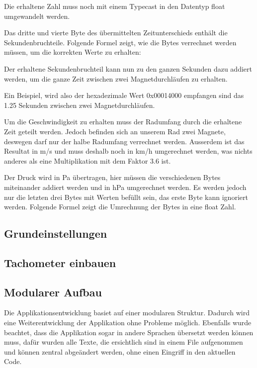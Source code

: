 
Die erhaltene Zahl muss noch mit einem Typecast in den Datentyp float umgewandelt werden.

Das dritte und vierte Byte des übermittelten Zeitunterschieds enthält die Sekundenbruchteile. Folgende Formel zeigt, wie die Bytes verrechnet werden müssen, um die korrekten Werte zu erhalten:


Der erhaltene Sekundenbruchteil kann nun zu den ganzen Sekunden dazu addiert werden, um die ganze Zeit zwischen zwei Magnetdurchläufen zu erhalten.

Ein Beispiel, wird also der hexadezimale Wert 0x00014000 empfangen sind das 1.25 Sekunden zwischen zwei Magnetdurchläufen.

Um die Geschwindigkeit zu erhalten muss der Radumfang durch die erhaltene Zeit geteilt werden. Jedoch befinden sich an unserem Rad zwei Magnete, deswegen darf nur der halbe Radumfang verrechnet werden. Ausserdem ist das Resultat in m/s und muss deshalb noch in km/h umgerechnet werden, was nichts anderes als eine Multiplikation mit dem Faktor 3.6 ist.

Der Druck wird in Pa übertragen, hier müssen die verschiedenen Bytes miteinander addiert werden und in hPa umgerechnet werden. Es werden jedoch nur die letzten drei Bytes mit Werten befüllt sein, das erste Byte kann ignoriert werden. Folgende Formel zeigt die Umrechnung der Bytes in eine float Zahl.




\subsection{Grundeinstellungen}

\subsection{Tachometer einbauen}

\subsection{Modularer Aufbau}

Die Applikationsentwicklung basiet auf einer modularen Struktur.  Dadurch wird eine Weiterentwicklung der Applikation ohne Probleme möglich. Ebenfalls wurde beachtet, dass die Applikation sogar in andere Sprachen übersetzt werden können muss, dafür wurden alle Texte, die ersichtlich sind in einem File aufgenommen und können zentral abgeändert werden, ohne einen Eingriff in den aktuellen Code.


